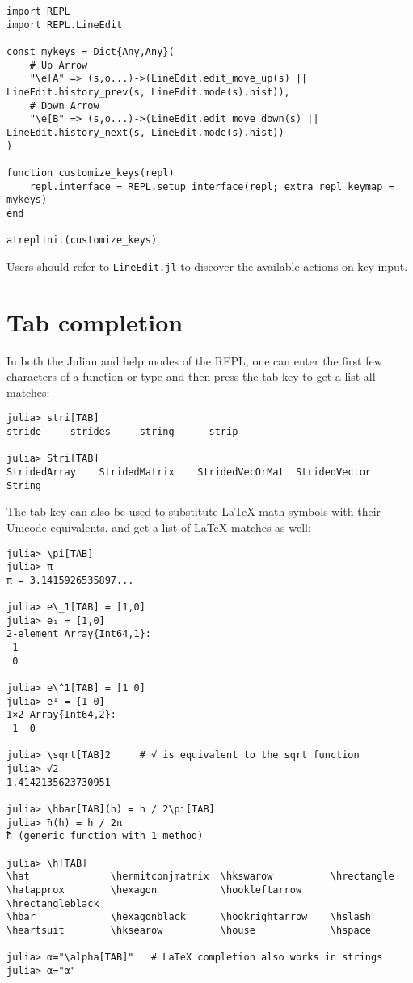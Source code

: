 \begin{verbatim}
import REPL
import REPL.LineEdit

const mykeys = Dict{Any,Any}(
    # Up Arrow
    "\e[A" => (s,o...)->(LineEdit.edit_move_up(s) || LineEdit.history_prev(s, LineEdit.mode(s).hist)),
    # Down Arrow
    "\e[B" => (s,o...)->(LineEdit.edit_move_down(s) || LineEdit.history_next(s, LineEdit.mode(s).hist))
)

function customize_keys(repl)
    repl.interface = REPL.setup_interface(repl; extra_repl_keymap = mykeys)
end

atreplinit(customize_keys)
\end{verbatim}



Users should refer to \texttt{LineEdit.jl} to discover the available actions on key input.



\hypertarget{9567689438493430677}{}


\section{Tab completion}



In both the Julian and help modes of the REPL, one can enter the first few characters of a function or type and then press the tab key to get a list all matches:




\begin{verbatim}
julia> stri[TAB]
stride     strides     string      strip

julia> Stri[TAB]
StridedArray    StridedMatrix    StridedVecOrMat  StridedVector    String
\end{verbatim}



The tab key can also be used to substitute LaTeX math symbols with their Unicode equivalents, and get a list of LaTeX matches as well:




\begin{verbatim}
julia> \pi[TAB]
julia> π
π = 3.1415926535897...

julia> e\_1[TAB] = [1,0]
julia> e₁ = [1,0]
2-element Array{Int64,1}:
 1
 0

julia> e\^1[TAB] = [1 0]
julia> e¹ = [1 0]
1×2 Array{Int64,2}:
 1  0

julia> \sqrt[TAB]2     # √ is equivalent to the sqrt function
julia> √2
1.4142135623730951

julia> \hbar[TAB](h) = h / 2\pi[TAB]
julia> ħ(h) = h / 2π
ħ (generic function with 1 method)

julia> \h[TAB]
\hat              \hermitconjmatrix  \hkswarow          \hrectangle
\hatapprox        \hexagon           \hookleftarrow     \hrectangleblack
\hbar             \hexagonblack      \hookrightarrow    \hslash
\heartsuit        \hksearow          \house             \hspace

julia> α="\alpha[TAB]"   # LaTeX completion also works in strings
julia> α="α"
\end{verbatim}



